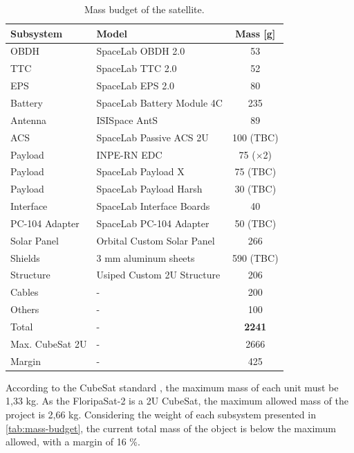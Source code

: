 \begin{table}[!h]
    \centering
    \begin{tabular}{llc}
        \toprule[1.5pt]
        \textbf{Subsystem} & \textbf{Model} & \textbf{Mass [g]} \\
        \midrule
        OBDH            & SpaceLab OBDH 2.0             & 53 \\
        TTC             & SpaceLab TTC 2.0              & 52 \\
        EPS             & SpaceLab EPS 2.0              & 80 \\
        Battery         & SpaceLab Battery Module 4C    & 235 \\
        Antenna         & ISISpace AntS                 & 89 \\
        ACS             & SpaceLab Passive ACS 2U       & 100 (TBC) \\
        Payload         & INPE-RN EDC                   & 75 ($\times$2) \\
        Payload         & SpaceLab Payload X            & 75 (TBC) \\
        Payload         & SpaceLab Payload Harsh        & 30 (TBC) \\
        Interface       & SpaceLab Interface Boards     & 40 \\
        PC-104 Adapter  & SpaceLab PC-104 Adapter       & 50 (TBC) \\
        Solar Panel     & Orbital Custom Solar Panel    & 266 \\
        Shields         & 3 mm aluminum sheets          & 590 (TBC) \\
        Structure       & Usiped Custom 2U Structure    & 206 \\
        Cables          & -                             & 200 \\
        Others          & -                             & 100 \\
        \midrule
        Total           & -                             & \textbf{2241} \\
        Max. CubeSat 2U & -                             & 2666 \\
        Margin          & -                             & 425 \\
        \bottomrule[1.5pt]
    \end{tabular}
    \caption{Mass budget of the satellite.}
    \label{tab:mass-budget}
\end{table}

According to the CubeSat standard \cite{cds}, the maximum mass of each unit must be 1,33 kg. As the FloripaSat-2 is a 2U CubeSat, the maximum allowed mass of the project is 2,66 kg. Considering the weight of each subsystem presented in \autoref{tab:mass-budget}, the current total mass of the object is below the maximum allowed, with a margin of 16 \%.

